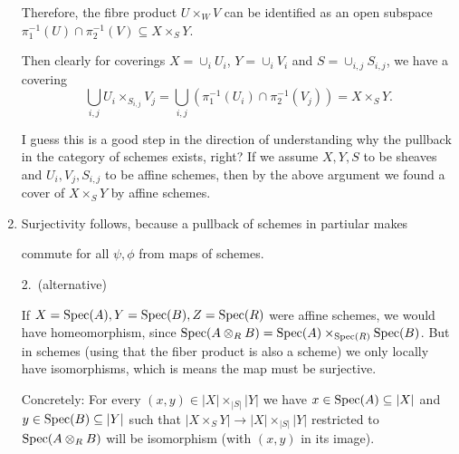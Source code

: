 \begin{exercise}{1}
\begin{enumerate}
{            %

            Therefore, the fibre product $U \times_W V$ can be identified as an
            open subspace $\pi^{-1}_1(U) \cap \pi^{-1}_2(V) \subseteq X \times_S
            Y$.

            Then clearly for coverings $X = \cup_i U_i$, $Y = \cup_i V_i$ and $S =
            \cup_{i, j} S_{i, j}$, we have a covering
            \begin{equation*}
                \bigcup_{i, j} U_i \times_{S_{i, j}} V_j = \bigcup_{i, j}
                (\pi^{-1}_1(U_i) \cap \pi^{-1}_2(V_j)) = X \times_S Y.
            \end{equation*}

            I guess this is a good step in the direction of understanding why the
            pullback in the category of schemes exists, right? If we assume $X, Y,
            S$ to be sheaves and $U_i, V_j, S_{i,j}$ to be affine schemes, then by
            the above argument we found a cover of $X\times_S Y$ by affine schemes.}

        \item{
            Surjectivity follows, because a pullback of schemes in partiular
            makes
            \begin{center}
            \end{center}
            commute for all $\psi, \phi$ from maps of schemes.
        }
        \item[2.\ (alternative)]{
            If $X = \operatorname{Spec}(A), Y = \operatorname{Spec}(B), Z = \operatorname{Spec}(R)$ were affine schemes,
            we would have homeomorphism, since $\operatorname{Spec}(A \otimes_R B) = \operatorname{Spec}(A)
            \times_{\operatorname{Spec}(R)} \operatorname{Spec}(B)$. But in schemes (using that the fiber
            product is also a scheme) we only locally have isomorphisms, which
            is means the map must be surjective.

            Concretely:
            For every $(x, y) \in |X| \times_{|S|} |Y|$ we have $x \in \operatorname{Spec}(A)
            \subseteq |X|$ and $y \in \operatorname{Spec}(B) \subseteq |Y|$ such that $|X
            \times_S Y| \to |X| \times_{|S|} |Y|$ restricted to $\operatorname{Spec}(A
            \otimes_R B)$ will be isomorphism (with $(x, y)$ in its image).
            }
    \end{enumerate}
\end{exercise}

